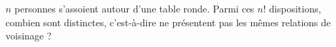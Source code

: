 $n$ personnes s'assoient autour d'une table ronde. Parmi ces $n!$ dispositions, combien sont distinctes, c'est-à-dire ne présentent pas les mêmes relations de voisinage ?
